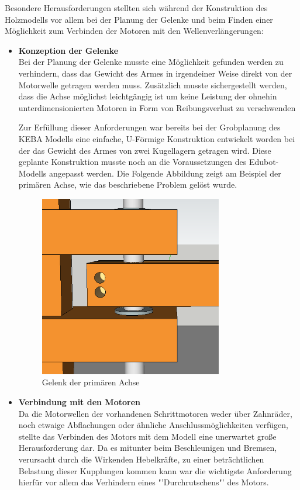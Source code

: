 Besondere Herausforderungen stellten sich während der Konstruktion des Holzmodells vor allem bei der Planung der Gelenke und beim Finden einer Möglichkeit zum Verbinden der Motoren mit den Wellenverlängerungen:
\begin{itemize}
\item \textbf{Konzeption der Gelenke}\\
Bei der Planung der Gelenke musste eine Möglichkeit gefunden werden zu verhindern, dass das Gewicht des Armes in irgendeiner Weise direkt von der Motorwelle getragen werden muss. Zusätzlich musste sichergestellt werden, dass die Achse möglichst leichtgängig ist um keine Leistung der ohnehin unterdimensionierten Motoren in Form von Reibungsverlust zu verschwenden

Zur Erfüllung dieser Anforderungen war bereits bei der Grobplanung des KEBA Modells eine einfache, U-Förmige Konstruktion entwickelt worden bei der das Gewicht des Armes von zwei Kugellagern getragen wird. Diese geplante Konstruktion musste noch an die Voraussetzungen des Edubot-Modells angepasst werden. 
\newpage
Die Folgende Abbildung zeigt am Beispiel der primären Achse, wie das beschriebene Problem gelöst wurde.

\begin{figure}[H]
  \centering
  \begin{minipage}[t]{8 cm}
  	\centering
  	\includegraphics[width=8cm]{images/primary_gelenk} 
    \caption{Gelenk der primären Achse}
  \end{minipage}
\end{figure}

\item \textbf{Verbindung mit den Motoren}\\
Da die Motorwellen der vorhandenen Schrittmotoren weder über Zahnräder, noch etwaige Abflachungen oder ähnliche Anschlussmöglichkeiten verfügen, stellte das Verbinden des Motors mit dem Modell eine unerwartet große Herausforderung dar. Da es mitunter beim Beschleunigen und Bremsen, verursacht durch die Wirkenden Hebelkräfte, zu einer beträchtlichen Belastung dieser Kupplungen kommen kann war die wichtigste Anforderung hierfür vor allem das Verhindern eines "'Durchrutschens"' des Motors. 


\end{itemize}
